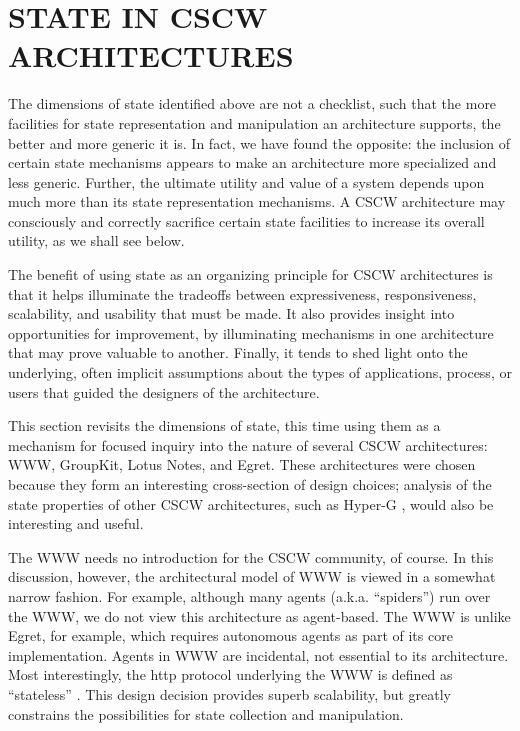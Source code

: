 \section{STATE IN CSCW ARCHITECTURES} 

The dimensions of state identified above are not a checklist, such that the
more facilities for state representation and manipulation an architecture
supports, the better and more generic it is.  In fact, we have found the
opposite: the inclusion of certain state mechanisms appears to make an
architecture more specialized and less generic. Further, the ultimate
utility and value of a system depends upon much more than its state
representation mechanisms.  A CSCW architecture may consciously and
correctly sacrifice certain state facilities to increase its overall
utility, as we shall see below.

The benefit of using state as an organizing principle for CSCW
architectures is that it helps illuminate the tradeoffs between
expressiveness, responsiveness, scalability, and usability that must be
made.  It also provides insight into opportunities for improvement, by
illuminating mechanisms in one architecture that may prove valuable to
another. Finally, it tends to shed light onto the underlying, often
implicit assumptions about the types of applications, process, or users
that guided the designers of the architecture.

This section revisits the dimensions of state, this time using them as a
mechanism for focused inquiry into the nature of several CSCW
architectures: WWW, GroupKit, Lotus Notes, and Egret.  These architectures
were chosen because they form an interesting cross-section of design
choices; analysis of the state properties of other CSCW architectures, such
as Hyper-G \cite{Andrews95}, would also be interesting and useful.


The WWW needs no introduction for the CSCW community, of course.  In this
discussion, however, the architectural model of WWW is viewed in a somewhat
narrow fashion.  For example, although many agents (a.k.a. ``spiders'') run
over the WWW, we do not view this architecture as agent-based. The WWW is
unlike Egret, for example, which requires autonomous agents as part of its
core implementation.  Agents in WWW are incidental, not essential to its
architecture. Most interestingly, the http protocol underlying the WWW is
defined as ``stateless'' \cite{Berners-Lee94}.  This design decision
provides superb scalability, but greatly constrains the possibilities for
state collection and manipulation.

